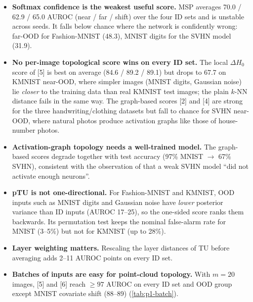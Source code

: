 \begin{itemize}
  \item \textbf{Softmax confidence is the weakest useful score.} MSP averages 70.0 / 62.9 / 65.0
  AUROC (near / far / shift) over the four ID sets and is unstable across seeds. It falls below
  chance where the network is confidently wrong: far-OOD for Fashion-MNIST (48.3), MNIST digits for
  the SVHN model (31.9).
  \item \textbf{No per-image topological score wins on every ID set.} The local $\Delta H_0$ score
  of [5] is best on average (84.6 / 89.2 / 89.1) but drops to 67.7 on KMNIST near-OOD, where simpler
  images (MNIST digits, Gaussian noise) lie \emph{closer} to the training data than real KMNIST test
  images; the plain $k$-NN distance fails in the same way. The graph-based scores [2] and [4] are
  strong for the three handwriting/clothing datasets but fall to chance for SVHN near-OOD, where
  natural photos produce activation graphs like those of house-number photos.
  \item \textbf{Activation-graph topology needs a well-trained model.} The graph-based scores degrade
  together with test accuracy (97\% MNIST $\to$ 67\% SVHN), consistent with the observation of
  \citep{yeh2025ptu} that a weak SVHN model ``did not activate enough neurons''.
  \item \textbf{pTU is not one-directional.} For Fashion-MNIST and KMNIST, OOD inputs such as MNIST
  digits and Gaussian noise have \emph{lower} posterior variance than ID inputs (AUROC 17--25), so
  the one-sided score ranks them backwards. Its permutation test keeps the nominal false-alarm rate
  for MNIST (3--5\%) but not for KMNIST (up to 28\%).
  \item \textbf{Layer weighting matters.} Rescaling the layer distances of TU before averaging adds
  2--11 AUROC points on every ID set.
  \item \textbf{Batches of inputs are easy for point-cloud topology.} With $m=20$ images, [5] and
  [6] reach $\ge97$ AUROC on every ID set and OOD group except MNIST covariate shift (88--89)
  (\cref{tab:p1-batch}).
\end{itemize}
